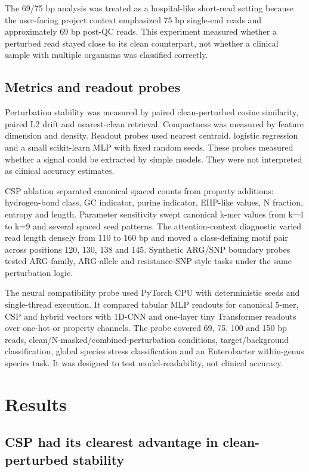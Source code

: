 \documentclass[10.5pt]{article}
\begin{document}
The 69/75 bp analysis was treated as a hospital-like short-read setting because the user-facing project context emphasized 75 bp single-end reads and approximately 69 bp post-QC reads. This experiment measured whether a perturbed read stayed close to its clean counterpart, not whether a clinical sample with multiple organisms was classified correctly.


\subsection*{Metrics and readout probes}

Perturbation stability was measured by paired clean-perturbed cosine similarity, paired L2 drift and nearest-clean retrieval. Compactness was measured by feature dimension and density. Readout probes used nearest centroid, logistic regression and a small scikit-learn MLP with fixed random seeds. These probes measured whether a signal could be extracted by simple models. They were not interpreted as clinical accuracy estimates.


CSP ablation separated canonical spaced counts from property additions: hydrogen-bond class, GC indicator, purine indicator, EIIP-like values, N fraction, entropy and length. Parameter sensitivity swept canonical k-mer values from k=4 to k=9 and several spaced seed patterns. The attention-context diagnostic varied read length densely from 110 to 160 bp and moved a class-defining motif pair across positions 120, 130, 138 and 145. Synthetic ARG/SNP boundary probes tested ARG-family, ARG-allele and resistance-SNP style tasks under the same perturbation logic.


The neural compatibility probe used PyTorch CPU with deterministic seeds and single-thread execution. It compared tabular MLP readouts for canonical 5-mer, CSP and hybrid vectors with 1D-CNN and one-layer tiny Transformer readouts over one-hot or property channels. The probe covered 69, 75, 100 and 150 bp reads, clean/N-masked/combined-perturbation conditions, target/background classification, global species stress classification and an Enterobacter within-genus species task. It was designed to test model-readability, not clinical accuracy.


\section*{Results}

\subsection*{CSP had its clearest advantage in clean-perturbed stability}
\end{document}

